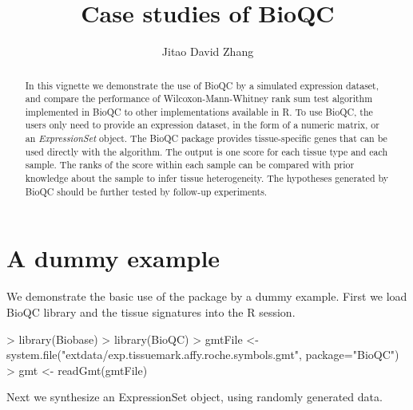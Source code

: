 \documentclass[11pt]{article}
\begin{document}
\title{Case studies of BioQC}
\author{Jitao David Zhang}

\maketitle

\begin{abstract}
  In this vignette we demonstrate the use of BioQC by a simulated expression dataset, and compare the performance of Wilcoxon-Mann-Whitney rank sum test algorithm implemented in BioQC to other implementations available in R. To use BioQC, the users only need to provide an expression dataset, in the form of a numeric matrix, or an \textit{ExpressionSet} object. The BioQC package provides tissue-specific genes that can be used directly with the algorithm. The output is one score for each tissue type and each sample. The ranks of the score within each sample can be compared with prior knowledge about the sample to infer tissue heterogeneity. The hypotheses generated by BioQC should be further tested by follow-up experiments.
\end{abstract}

\section{A dummy example}

We demonstrate the basic use of the package by a dummy example. First we load BioQC library and the tissue signatures into the R session. 


\begin{Schunk}
\begin{Sinput}
> library(Biobase)
> library(BioQC)
> gmtFile <- system.file("extdata/exp.tissuemark.affy.roche.symbols.gmt", package="BioQC")
> gmt <- readGmt(gmtFile)
\end{Sinput}
\end{Schunk}

Next we synthesize an ExpressionSet object, using randomly generated data.
\begin{Schunk}
\end{Schunk}
\end{document}
